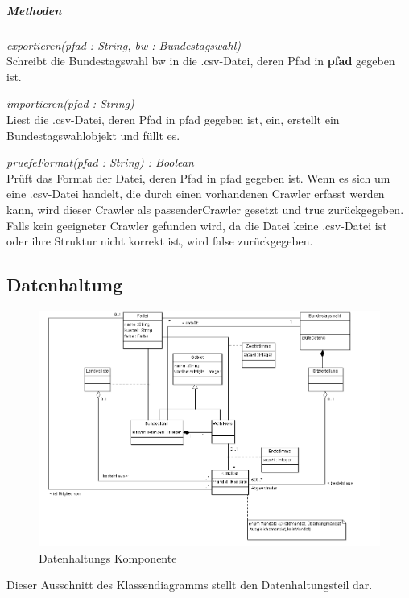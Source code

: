 \documentclass[12pt,a4paper,titlepage]{article}
\newcommand{\mymo}{\fontfamily{pcr}\selectfont \textit}
\begin{document}
\subparagraph{Methoden}
\begin{description}
\item {\mymo{exportieren(pfad : String, bw : Bundestagswahl)}} \\
Schreibt die Bundestagswahl bw in die .csv-Datei, deren Pfad in \textbf{pfad} gegeben ist.
\item {\mymo{importieren(pfad : String)}} \\
Liest die .csv-Datei, deren Pfad in pfad gegeben ist, ein, erstellt ein Bundestagswahlobjekt und füllt es.
\item {\mymo{pruefeFormat(pfad : String) : Boolean}} \\
Prüft das Format der Datei, deren Pfad in pfad gegeben ist. Wenn es sich um eine .csv-Datei handelt, die durch einen vorhandenen Crawler erfasst werden kann, wird dieser Crawler als passenderCrawler gesetzt und true zurückgegeben. Falls kein geeigneter Crawler gefunden wird, da die Datei keine .csv-Datei ist oder ihre Struktur nicht korrekt ist, wird false zurückgegeben.

\end{description}

\newpage

\subsection{Datenhaltung}
\begin{figure}[!ht]
\includegraphics[scale=0.4]{Datenhaltung-Ausschnitt} \caption{Datenhaltungs Komponente} 
\end{figure}

Dieser Ausschnitt des Klassendiagramms stellt den Datenhaltungsteil dar.
\end{document}

